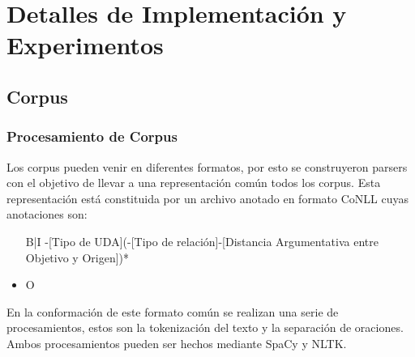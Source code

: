 \chapter{Detalles de Implementación y Experimentos}\label{chapter:implementation}







\section{Corpus}

\subsection{Procesamiento de Corpus}

Los corpus pueden venir en diferentes formatos, por esto se construyeron parsers con el objetivo
de llevar a una representación común todos los corpus. Esta representación está constituida por
un archivo anotado en formato CoNLL cuyas anotaciones son:

\begin{itemize}
    \item [B|I]-[Tipo de UDA](-[Tipo de relación]-[Distancia Argumentativa entre Objetivo y Origen])*
    \item O
\end{itemize}

En la conformación de este formato común se realizan una serie de procesamientos, estos son la 
tokenización del texto y la separación de oraciones. Ambos procesamientos pueden ser hechos 
mediante SpaCy y NLTK. 


